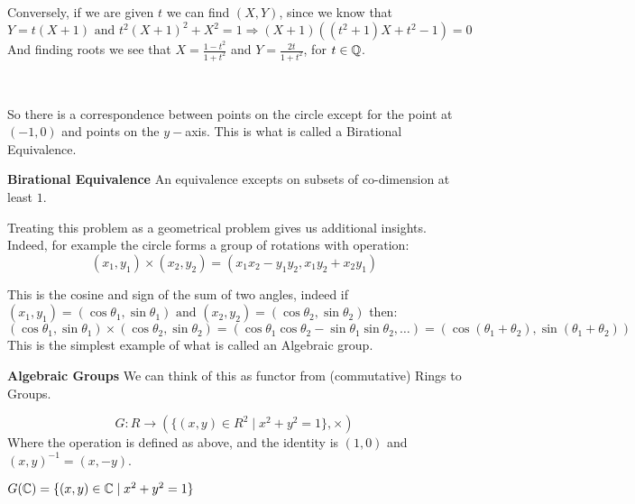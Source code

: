 \begin{enumerate}
    Conversely, if we are given $t$ we can find $(X,Y)$, since we know that\begin{equation*}
        Y=t(X+1) \text{ and }t^2{(X+1)}^2 + X^2 = 1 \Rightarrow (X+1)((t^2+1)X+t^2-1) = 0
    \end{equation*}
    And finding roots we see that $X = \frac{1-t^2}{1+t^2}$ and $Y=\frac{2t}{1+t^2}$, for $t\in \mathbb{Q}$.
    
    \
    
    So there is a correspondence between points on the circle except for the point at $(-1,0)$ and points on the $y-$axis. This is what is called a Birational Equivalence.
    
    \begin{definition}
        \textbf{Birational Equivalence}
        An equivalence excepts on subsets of co-dimension at least $1$.
    \end{definition}
\end{enumerate}
Treating this problem as a geometrical problem gives us additional insights. Indeed, for example the circle forms a group of rotations with operation:\begin{equation}
    (x_1,y_1)\times (x_2,y_2) = (x_1x_2-y_1y_2,x_1y_2+x_2y_1)
\end{equation}

This is the cosine and sign of the sum of two angles, indeed if $(x_1,y_1) = (\cos\theta_1,\sin\theta_1)\text{ and }(x_2,y_2) = (\cos\theta_2,\sin\theta_2)$ then:\begin{equation}
 (\cos\theta_1,\sin\theta_1)\times (\cos\theta_2,\sin\theta_2) = (\cos\theta_1\cos\theta_2-\sin\theta_1\sin\theta_2, \dots) = (\cos(\theta_1+\theta_2),\sin(\theta_1+\theta_2))
\end{equation}
This is the simplest example of what is called an Algebraic group.

\begin{definition}
    \textbf{Algebraic Groups} We can think of this as functor from (commutative) Rings to Groups.

    \begin{equation}
        G\colon R\rightarrow (\{(x,y)\in R^2\mid x^2+y^2=1\},\times)
     \end{equation}
     Where the operation is defined as above, and the identity is $(1,0)$ and ${(x,y)}^{-1} = (x,-y)$.
     
\end{definition}

\begin{example}
    $G(\mathbb{C}) = \{(x,y)\in\mathbb{C} \mid x^2+y^2 = 1\}$
\end{example} 

